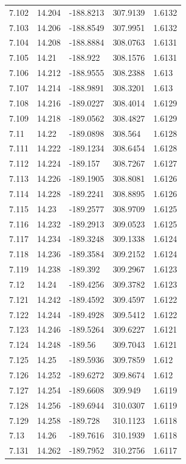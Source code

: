\begin{tabular}{lllll}
7.102 & 14.204 & -188.8213 & 307.9139 & 1.6132 \\
7.103 & 14.206 & -188.8549 & 307.9951 & 1.6132 \\
7.104 & 14.208 & -188.8884 & 308.0763 & 1.6131 \\
7.105 & 14.21 & -188.922 & 308.1576 & 1.6131 \\
7.106 & 14.212 & -188.9555 & 308.2388 & 1.613 \\
7.107 & 14.214 & -188.9891 & 308.3201 & 1.613 \\
7.108 & 14.216 & -189.0227 & 308.4014 & 1.6129 \\
7.109 & 14.218 & -189.0562 & 308.4827 & 1.6129 \\
7.11 & 14.22 & -189.0898 & 308.564 & 1.6128 \\
7.111 & 14.222 & -189.1234 & 308.6454 & 1.6128 \\
7.112 & 14.224 & -189.157 & 308.7267 & 1.6127 \\
7.113 & 14.226 & -189.1905 & 308.8081 & 1.6126 \\
7.114 & 14.228 & -189.2241 & 308.8895 & 1.6126 \\
7.115 & 14.23 & -189.2577 & 308.9709 & 1.6125 \\
7.116 & 14.232 & -189.2913 & 309.0523 & 1.6125 \\
7.117 & 14.234 & -189.3248 & 309.1338 & 1.6124 \\
7.118 & 14.236 & -189.3584 & 309.2152 & 1.6124 \\
7.119 & 14.238 & -189.392 & 309.2967 & 1.6123 \\
7.12 & 14.24 & -189.4256 & 309.3782 & 1.6123 \\
7.121 & 14.242 & -189.4592 & 309.4597 & 1.6122 \\
7.122 & 14.244 & -189.4928 & 309.5412 & 1.6122 \\
7.123 & 14.246 & -189.5264 & 309.6227 & 1.6121 \\
7.124 & 14.248 & -189.56 & 309.7043 & 1.6121 \\
7.125 & 14.25 & -189.5936 & 309.7859 & 1.612 \\
7.126 & 14.252 & -189.6272 & 309.8674 & 1.612 \\
7.127 & 14.254 & -189.6608 & 309.949 & 1.6119 \\
7.128 & 14.256 & -189.6944 & 310.0307 & 1.6119 \\
7.129 & 14.258 & -189.728 & 310.1123 & 1.6118 \\
7.13 & 14.26 & -189.7616 & 310.1939 & 1.6118 \\
7.131 & 14.262 & -189.7952 & 310.2756 & 1.6117 \\

\end{tabular}
